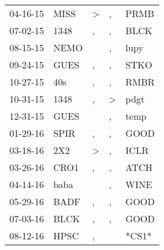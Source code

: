 \begin{supertabular}{p{0.07\textwidth}p{0.06\textwidth}p{0.02\textwidth}p{0.02\textwidth}p{0.06\textwidth}}
          04-16-15\textsuperscript{} &           MISS\textsuperscript{} &     \textgreater &                , &           PRMB\textsuperscript{} \\
          07-02-15\textsuperscript{} &           1348\textsuperscript{} &                , &                , &           BLCK\textsuperscript{} \\
          08-15-15\textsuperscript{} &           NEMO\textsuperscript{} &                  &                , &           lupy\textsuperscript{} \\
          09-24-15\textsuperscript{} &           GUES\textsuperscript{} &                , &                , &           STKO\textsuperscript{} \\
          10-27-15\textsuperscript{} &            40s\textsuperscript{} &                , &                , &           RMBR\textsuperscript{} \\
          10-31-15\textsuperscript{} &           1348\textsuperscript{} &                , &     \textgreater &           pdgt\textsuperscript{} \\
          12-31-15\textsuperscript{} &           GUES\textsuperscript{} &                  &                , &           temp\textsuperscript{} \\
          01-29-16\textsuperscript{} &           SPIR\textsuperscript{} &                , &                , &           GOOD\textsuperscript{} \\
          03-18-16\textsuperscript{} &            2X2\textsuperscript{} &     \textgreater &                , &           ICLR\textsuperscript{} \\
          03-26-16\textsuperscript{} &           CRO1\textsuperscript{} &                , &                , &           ATCH\textsuperscript{} \\
          04-14-16\textsuperscript{} &           baba\textsuperscript{} &                  &                , &           WINE\textsuperscript{} \\
          05-29-16\textsuperscript{} &           BADF\textsuperscript{} &                , &                , &           GOOD\textsuperscript{} \\
          07-03-16\textsuperscript{} &           BLCK\textsuperscript{} &                , &                , &           GOOD\textsuperscript{} \\
          08-12-16\textsuperscript{} &           HPSC\textsuperscript{} &                , &                  &                            *CS1* \\

\end{supertabular}

